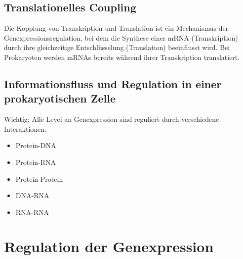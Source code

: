 \subsection{Translationelles Coupling}
Die Kopplung von Transkription und Translation ist ein Mechanismus der Genexpressionsregulation, bei dem die Synthese einer mRNA (Transkription) durch ihre gleichzeitige Entschlüsselung (Translation) beeinflusst wird. Bei Prokaryoten werden mRNAs bereits während ihrer Transkription translatiert. 
\subsection{Informationsfluss und Regulation in einer prokaryotischen Zelle}
Wichtig: Alle Level an Genexpression sind reguliert durch verschiedene Interaktionen: \begin{itemize}
    \item Protein-DNA
    \item Protein-RNA
    \item Protein-Protein
    \item DNA-RNA
    \item RNA-RNA
\end{itemize}
\section{Regulation der Genexpression} 
